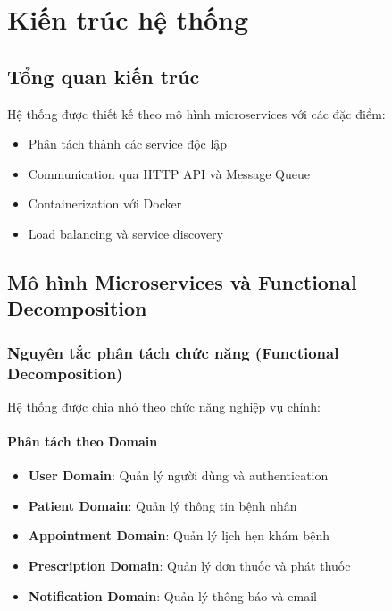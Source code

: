 \documentclass[12pt,a4paper]{report}
\begin{document}
\chapter{Kiến trúc hệ thống}

\section{Tổng quan kiến trúc}
Hệ thống được thiết kế theo mô hình microservices với các đặc điểm:
\begin{itemize}
    \item Phân tách thành các service độc lập
    \item Communication qua HTTP API và Message Queue
    \item Containerization với Docker
    \item Load balancing và service discovery
\end{itemize}

\section{Mô hình Microservices và Functional Decomposition}

\subsection{Nguyên tắc phân tách chức năng (Functional Decomposition)}
Hệ thống được chia nhỏ theo chức năng nghiệp vụ chính:

\subsubsection{Phân tách theo Domain}
\begin{itemize}
    \item \textbf{User Domain}: Quản lý người dùng và authentication
    \item \textbf{Patient Domain}: Quản lý thông tin bệnh nhân
    \item \textbf{Appointment Domain}: Quản lý lịch hẹn khám bệnh
    \item \textbf{Prescription Domain}: Quản lý đơn thuốc và phát thuốc
    \item \textbf{Notification Domain}: Quản lý thông báo và email
\end{itemize}
\end{document}
